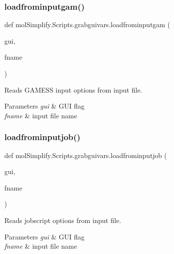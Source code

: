 \subsubsection{\texorpdfstring{loadfrominputgam()}{loadfrominputgam()}}
{\footnotesize\ttfamily def mol\+Simplify.\+Scripts.\+grabguivars.\+loadfrominputgam (\begin{DoxyParamCaption}\item[{}]{gui,  }\item[{}]{fname }\end{DoxyParamCaption})}



Reads G\+A\+M\+E\+SS input options from input file. 


\begin{DoxyParams}{Parameters}
{\em gui} & G\+UI flag \\
\hline
{\em fname} & input file name \\
\hline
\end{DoxyParams}
\mbox{\label{namespacemolSimplify_1_1Scripts_1_1grabguivars_a447887b9c0ca14394218c26db86889b1}} 
\subsubsection{\texorpdfstring{loadfrominputjob()}{loadfrominputjob()}}
{\footnotesize\ttfamily def mol\+Simplify.\+Scripts.\+grabguivars.\+loadfrominputjob (\begin{DoxyParamCaption}\item[{}]{gui,  }\item[{}]{fname }\end{DoxyParamCaption})}



Reads jobscript options from input file. 


\begin{DoxyParams}{Parameters}
{\em gui} & G\+UI flag \\
\hline
{\em fname} & input file name \\
\hline
\end{DoxyParams}
\mbox{\label{namespacemolSimplify_1_1Scripts_1_1grabguivars_a6b1557164e134acf87291e06e71e8a11}} 
